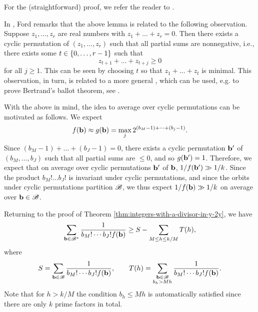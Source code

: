 For the (straightforward) proof, we refer the reader to \cite{integerswithadivisor}.
\begin{remark}
    In \cite{integerswithadivisor}, Ford remarks that the above lemma is related to the following observation.
    Suppose $z_1, \dots, z_r$ are real numbers with $z_1+ \dots + z_r = 0$.
    Then there exists a cyclic permutation of $(z_1, \dots, z_r)$ such that all partial sums are nonnegative, i.e., there exists some $t \in \left\{0, \dots, r - 1\right\}$ such that
    \begin{equation*}
        z_{t+1} + \dots + z_{t + j} \ge 0
    \end{equation*}
    for all $j \ge 1$. This can be seen by choosing $t$ so that $z_1 + \dots + z_t$ is minimal.
    This observation, in turn, is related to a more general , which can be used, e.g. to prove Bertrand's ballot theorem, see \cite{aproblemofarrangements}.

    With the above in mind, the idea to average over cyclic permutations can be motivated as follows. 
    We expect 
    \begin{equation*}
        f(\mathbf{b}) \approx g(\mathbf{b}) = \max_{j} 2^{(b_M - 1) + \dots + (b_j - 1)}.
    \end{equation*}
    Since $(b_M - 1) + \dots + (b_J - 1) = 0$, there exists a cyclic permutation $\mathbf{b}'$ of $(b_M, \dots, b_J)$ such that all partial sums are $\le 0$, and so $g(\mathbf{b}') = 1$.
    Therefore, we expect that on average over cyclic permutations $\mathbf{b}'$ of $\mathbf{b}$, $1/f(\mathbf{b}') \gg 1/k$.
    Since the product $b_M! \dots b_J!$ is invariant under cyclic permutations, and since the orbits under cyclic permutations partition $\mathscr{B}$, we thus expect $1/f(\mathbf{b}) \gg 1/k$ on average over $\mathbf{b} \in \mathscr{B}$.
\end{remark}

Returning to the proof of Theorem \ref{thm:integers-with-a-divisor-in-y-2y}, we have
\begin{equation} \label{eq:estimate-sum-over-b-by-T-and-S}
    \sum \limits_{\mathbf{b} \in \mathscr{B}^*} \frac{1}{b_M! \cdots b_J! f(\mathbf{b})} \ge S - \sum \limits_{M\le h \le k/M} T(h),
\end{equation}
where 
\begin{align*}
    S = \sum \limits_{\mathbf{b} \in \mathscr{B}}\frac{1}{b_M! \cdots b_J! f(\mathbf{b})}, \qquad T(h) = \sum \limits_{\substack{\mathbf{b} \in \mathscr{B}\\b_h > Mh}}\frac{1}{b_M! \cdots b_J!f(\mathbf{b})}.
\end{align*}
Note that for $h > k/M$ the condition $b_h \le Mh$ is automatically satisfied since there are only $k$ prime factors in total.

